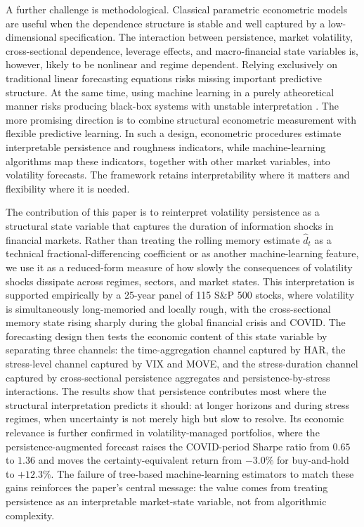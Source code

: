 \documentclass[11pt,a4paper]{article}
\begin{document}
A further challenge is methodological. Classical parametric econometric
models are useful when the dependence structure is stable and well captured
by a low-dimensional specification. The interaction between persistence,
market volatility, cross-sectional dependence, leverage effects, and
macro-financial state variables is, however, likely to be nonlinear and
regime dependent. Relying exclusively on traditional linear forecasting
equations risks missing important predictive structure. At the same time,
using machine learning in a purely atheoretical manner risks producing
black-box systems with unstable interpretation \citep{gu2020empirical}. The
more promising direction is to combine structural econometric measurement
with flexible predictive learning. In such a design, econometric procedures
estimate interpretable persistence and roughness indicators, while
machine-learning algorithms map these indicators, together with other
market variables, into volatility forecasts. The framework retains
interpretability where it matters and flexibility where it is needed.

The contribution of this paper is to reinterpret volatility persistence as a structural state variable that captures the duration of information shocks in financial markets. Rather than treating the rolling memory estimate $\hat d_t$ as a technical fractional-differencing coefficient or as another machine-learning feature, we use it as a reduced-form measure of how slowly the consequences of volatility shocks dissipate across regimes, sectors, and market states. This interpretation is supported empirically by a 25-year panel of 115 S\&P 500 stocks, where volatility is simultaneously long-memoried and locally rough, with the cross-sectional memory state rising sharply during the global financial crisis and COVID. The forecasting design then tests the economic content of this state variable by separating three channels: the time-aggregation channel captured by HAR, the stress-level channel captured by VIX and MOVE, and the stress-duration channel captured by cross-sectional persistence aggregates and persistence-by-stress interactions. The results show that persistence contributes most where the structural interpretation predicts it should: at longer horizons and during stress regimes, when uncertainty is not merely high but slow to resolve. Its economic relevance is further confirmed in volatility-managed portfolios, where the persistence-augmented forecast raises the COVID-period Sharpe ratio from $0.65$ to $1.36$ and moves the certainty-equivalent return from $-3.0\%$ for buy-and-hold to $+12.3\%$. The failure of tree-based machine-learning estimators to match these gains reinforces the paper's central message: the value comes from treating persistence as an interpretable market-state variable, not from algorithmic complexity.
\end{document}
